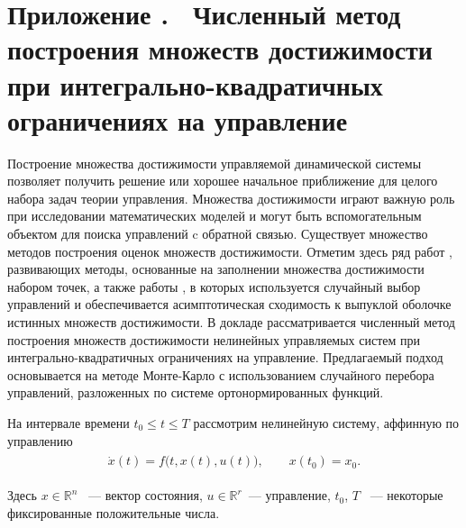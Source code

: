\documentclass[../main.tex]{subfiles}
\begin{document}
\clearpage
\setcounter{section}{0}%
\renewcommand{\thesection}{\Alph{section}}%
\section*{Приложение .  Численный метод построения множеств достижимости при интегрально-квадратичных ограничениях на управление}%
\label{app:A}%
\renewcommand{\theequation}{\Alph{section}.\arabic{equation}}%
\setcounter{equation}{0}
  Построение множества достижимости управляемой динамической системы позволяет получить решение или хорошее начальное
  приближение для целого набора задач теории управления. 
  Множества достижимости играют важную роль при исследовании математических моделей и могут быть вспомогательным объектом для поиска управлений c обратной связью. 
  Существует множество методов построения оценок множеств достижимости. 
  Отметим здесь ряд работ \cite{Gornov2015, Gornov2017}, развивающих методы, основанные на заполнении множества достижимости набором точек, а также работы \cite{Lew2020, Lew2022}, в которых используется случайный выбор управлений и обеспечивается асимптотическая сходимость к выпуклой оболочке истинных множеств достижимости.
  В докладе рассматривается численный метод построения множеств достижимости нелинейных управляемых систем при интегрально-квадратичных ограничениях на управление. 
  Предлагаемый подход основывается на методе Монте-Карло с использованием случайного перебора управлений, разложенных по системе ортонормированных функций.
  
  На интервале времени $ t_0 \leqslant t \leqslant {T} $ рассмотрим нелинейную систему, аффинную по управлению
  \begin{gather}\label{a1:common_nonlinear}
  	\begin{gathered}
  		\dot{x}(t)=f\big(t, x(t), u(t)\big), \qquad x(t_0) = x_0.
  	\end{gathered}
  \end{gather}
  
  Здесь $ x \in \mathbb{R}^n $ ~--- вектор состояния, $ u \in \mathbb{R}^r $~--- управление,  $t_0$, $ {T} $ ~--- некоторые фиксированные положительные числа.
  
\end{document}
